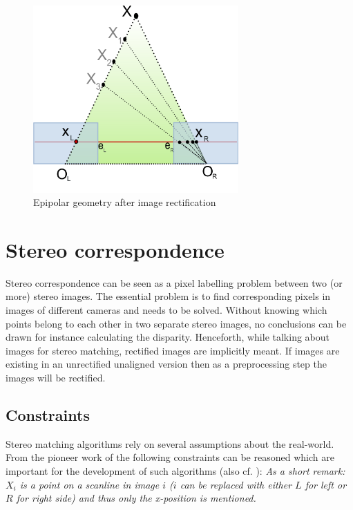 \begin{figure}[h!]
  \centering
  \includegraphics[width=0.7\textwidth]{src/images/epipolar-rectified.png}
  \caption[Epipolar geometry after image rectification]{Epipolar geometry after image rectification\protect\footnotemark}
  \label{fig:epipolar-rectified}
\end{figure}

\newpage

\section{Stereo correspondence}

Stereo correspondence can be seen as a pixel labelling problem \citep{wanner2013reconstructing, cyganek2011introduction} between two (or more) stereo images.
The essential problem is to find corresponding pixels in images of different cameras and needs to be solved.
Without knowing which points belong to each other in two separate stereo images, no conclusions can be drawn for instance calculating the disparity.
Henceforth, while talking about images for stereo matching, rectified images are implicitly meant.
If images are existing in an unrectified unaligned version then as a preprocessing step the images will be rectified.

\subsection*{Constraints}

Stereo matching algorithms rely on several assumptions about the real-world.
From the pioneer work of \citeauthor{marr1976cooperative} \citep{marr1976cooperative} the following constraints can be reasoned which are important for the development of such algorithms (also cf. \citep{cyganek2011introduction, wanner2013reconstructing,kack2004robust}):
\newline\newline\noindent \textit{As a short remark: $X_i$ is a point on a scanline in image $i$ ($i$ can be replaced with either $L$ for left or $R$ for right side) and thus only the x-position is mentioned.}

